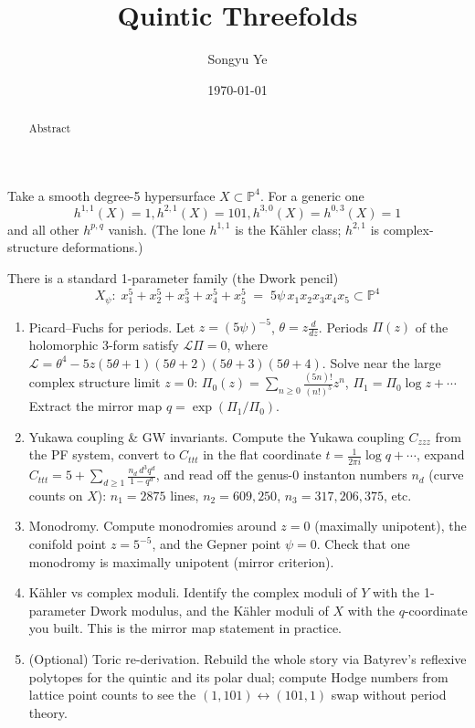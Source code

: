 \documentclass[12pt]{article}
\begin{document}
\rhead{\today}
\cfoot{\thepage}

\title{Quintic Threefolds}

\author{Songyu Ye}
\date{\today}
\maketitle


\begin{abstract}
Abstract
\end{abstract}

\tableofcontents

Take a smooth degree-5 hypersurface $X\subset \mathbb{P}^4$. For a generic one 
\[h^{1,1}(X)=1, h^{2,1}(X)=101, h^{3,0}(X)=h^{0,3}(X)=1 \] and all other $h^{p,q}$ vanish. (The lone $h^{1,1}$ is the Kähler class; $h^{2,1}$ is complex-structure deformations.)


There is a standard 1-parameter family (the Dwork pencil)  \[X_\psi:\; x_1^5+x_2^5+x_3^5+x_4^5+x_5^5 \;=\; 5\psi\,x_1x_2x_3x_4x_5 \subset \mathbb{P}^4\]
\begin{enumerate}
    \item Picard--Fuchs for periods. Let $z=(5\psi)^{-5}$, $\theta=z\frac{d}{dz}$. Periods $\Pi(z)$ of the holomorphic 3-form satisfy
    $\mathcal{L}\Pi=0$, where
    $\mathcal{L}=\theta^4-5z(5\theta+1)(5\theta+2)(5\theta+3)(5\theta+4)$.
    Solve near the large complex structure limit $z=0$:
    $\Pi_0(z)=\sum_{n\ge0}\frac{(5n)!}{(n!)^5}z^n$,
    $\Pi_1=\Pi_0\log z+\cdots$
    Extract the mirror map $q=\exp(\Pi_1/\Pi_0)$.

    \item Yukawa coupling \& GW invariants. Compute the Yukawa coupling $C_{zzz}$ from the PF system, convert to $C_{ttt}$ in the flat coordinate $t=\frac{1}{2\pi i}\log q+\cdots$, expand
    $C_{ttt}=5+\sum_{d\ge1} \frac{n_d\,d^3 q^d}{1-q^d}$,
    and read off the genus-0 instanton numbers $n_d$ (curve counts on $X$):
    $n_1=2875$ lines, $n_2=609,250$, $n_3=317,206,375$, etc.

    \item Monodromy. Compute monodromies around $z=0$ (maximally unipotent), the conifold point $z=5^{-5}$, and the Gepner point $\psi=0$. Check that one monodromy is maximally unipotent (mirror criterion).

    \item Kähler vs complex moduli. Identify the complex moduli of $Y$ with the 1-parameter Dwork modulus, and the Kähler moduli of $X$ with the $q$-coordinate you built. This is the mirror map statement in practice.

    \item (Optional) Toric re-derivation. Rebuild the whole story via Batyrev's reflexive polytopes for the quintic and its polar dual; compute Hodge numbers from lattice point counts to see the $(1,101)\leftrightarrow(101,1)$ swap without period theory.
\end{enumerate}
\end{document}
